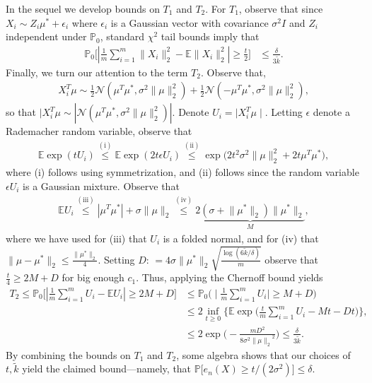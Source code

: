 \documentclass[twoside,11pt]{article}
\newcommand{\Exs}{\ensuremath{{\mathbb{E}}}}
\newcommand{\numobs}{\ensuremath{n}}
\newcommand{\NORMAL}{\ensuremath{\mathcal{N}}}
\def\EE{ \mathbb{E} }
\newcommand{\norm}[1]{\ensuremath{\|#1\|_2}}
\newcommand{\subsize}{\numobs} %
\newcommand{\subprob}{\delta}
\newcommand{\blocksize}{\ensuremath{m}}
\newcommand{\tk}{\ensuremath{\tilde{k}}}
\newcommand{\paramobs}{\mu}
\newcommand{\samperror}[1]{e_{#1}}
\newcommand{\mprob}{\ensuremath{\mathbb{P}}}
\newcommand{\defn}{: \, = }
\newcommand{\mustar}{\ensuremath{\mu^*}}
\begin{document}
\noindent In the sequel we develop bounds on $T_1$ and $T_2$.  For
$T_1$, observe that since $X_i \sim Z_i \mu^* + \epsilon_i$
where $\epsilon_i$ is a Gaussian vector with covariance $\sigma^2 I$ and
$Z_i$ independent under $\mprob_0$,
standard $\chi^2$ tail bounds imply that
\begin{align*}
\mprob_0 \Big[ | \frac{1}{\blocksize}\sum_{i=1}^\blocksize \|X_i\|_2^2
  - \EE \|X_i\|_2^2 | \geq \frac{t}{2} \Big] & \leq
\frac{\subprob}{3\tk}.
\end{align*}
Finally, we turn our attention to the term $T_2$. Observe that,
\begin{align*}
X_i^T \mu \sim \frac{1}{2} \NORMAL( \mu^T \mu^*, \sigma^2
\|\paramobs\|_2^2) + \frac{1}{2} \NORMAL( -\mu^T \mu^*, \sigma^2
\|\paramobs\|_2^2),
\end{align*}
so that $ \mid X_i^T \mu \sim |\NORMAL( \mu^T \mu^*, \sigma^2
\|\paramobs\|_2^2) |$.  Denote $U_i = \mid X_i^T \mu \mid$. Letting
$\epsilon$ denote a Rademacher random variable, observe that
\begin{align*}
\Exs \exp (t U_i) \stackrel{\mathrm{(i)}}{\leq} \mathbb{E} \exp (2 t
\epsilon U_i) \stackrel{\mathrm{(ii)}}{\leq} \exp \big( 2 t^2 \sigma^2
\|\paramobs\|_2^2 + 2 t \mu^T \mu^* \big),
\end{align*}
where (i) follows using symmetrization, and (ii) follows since the
random variable $\epsilon U_i$ is a Gaussian mixture.  Observe that
\begin{align*}
\mathbb{E} U_i \stackrel{\mathrm{(iii)}}{\leq} |\mu^T \mu^*| + \sigma
\|\paramobs\|_2 \stackrel{\mathrm{(iv)}}{\leq} \underbrace{2 ( \sigma
  + \norm{\mustar}) \norm{\mustar}}_{M},
\end{align*}
where we have used for (iii) that $U_i$ is a folded normal, and for
(iv) that $\|\mu - \mustar\|_2 \leq \frac{\|\mustar\|_2}{4}$.  Setting
$D \defn 4 \sigma \norm{\mustar} \sqrt{ \frac{\log
    (6\tk/\subprob)}{\blocksize}}$ observe that $\frac{t}{4} \geq 2 M
+ D$ for big enough $c_1$.  Thus, applying the Chernoff bound yields
\begin{align*}
T_2 \leq \mprob_0 \Big[ |\frac{1}{\blocksize} \sum_{i=1}^\blocksize
  U_i - \mathbb{E} U_i| \geq 2M + D \Big] & \leq \mprob_0 \Big( \mid
\frac{1}{\blocksize} \sum_{i=1}^\blocksize U_i \mid \geq M+ D \Big) \\
%
& \leq 2 \inf_{t \geq 0} \Big\{ \mathbb{E} \exp \Big(
\frac{t}{\blocksize} \sum_{i=1}^\blocksize U_i - Mt - Dt \Big) \Big\},
\\
%
& \leq 2 \exp \Big( - \frac{\blocksize D^2}{ 8 \sigma^2
  \norm{\mu}^2}\Big) \leq \frac{\subprob}{3\tk}.
\end{align*}
By combining the bounds on $T_1$ and $T_2$, some algebra shows that
our choices of $t,\tk$ yield the claimed bound---namely, that $\mprob
\big[ \samperror{\subsize}(X) \geq t/(2\sigma^2) \big] \leq \subprob$.
\end{document}
